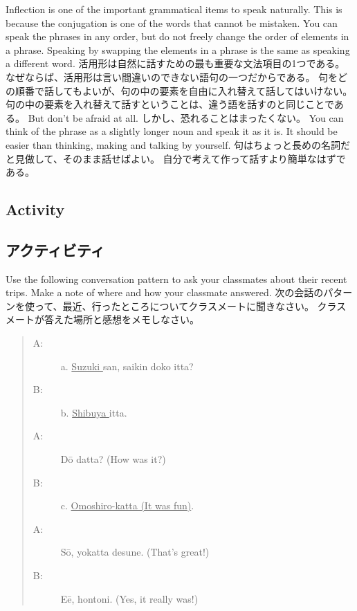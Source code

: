 \documentclass[uplatex,dvipdfmx,b5paper,english,10pt]{jsbook}
\begin{document}
\ifEnglish
Inflection is one of the important grammatical items to speak naturally.
This is because the conjugation is one of the words that cannot be mistaken.
You can speak the phrases in any order, but do not freely change the order of elements in a phrase.
Speaking by swapping the elements in a phrase is the same as speaking a different word.
\else
活用形は自然に話すための最も重要な文法項目の1つである。
なぜならば、活用形は言い間違いのできない語句の一つだからである。
句をどの順番で話してもよいが、句の中の要素を自由に入れ替えて話してはいけない。
句の中の要素を入れ替えて話すということは、違う語を話すのと同じことである。
\fi
\ifEnglish
But don't be afraid at all.
\else
しかし、恐れることはまったくない。
\fi
\ifEnglish
You can think of the phrase as a slightly longer noun and speak it as it is.
It should be easier than thinking, making and talking by yourself.
\else
句はちょっと長めの名詞だと見做して、そのまま話せばよい。
自分で考えて作って話すより簡単なはずである。
\fi

\ifEnglish
\subsection{Activity}
\else
\subsection{アクティビティ}
\fi

\begin{toiquestion}
\ifEnglish
Use the following conversation pattern to ask your classmates about their recent trips.
Make a note of where and how your classmate answered.
\else
次の会話のパターンを使って、最近、行ったところについてクラスメートに聞きなさい。
クラスメートが答えた場所と感想をメモしなさい。
\fi
\end{toiquestion}

 \begin{quote}
 \begin{description}
  \item[A:] a. \underline{ Suzuki } san, saikin doko itta?
  \item[B:] b. \underline{ Shibuya } itta.
  \item[A:] \hspace*{3ex} D\={o} datta? (How was it?)
  \item[B:] c. \underline{ Omoshiro-katta (It was fun)}.
  \item[A:] S\=o, yokatta desune. (That's great!)
  \item[B:] E\=e, hontoni. (Yes, it really was!)
 \end{description}
 \end{quote}
\end{document}
